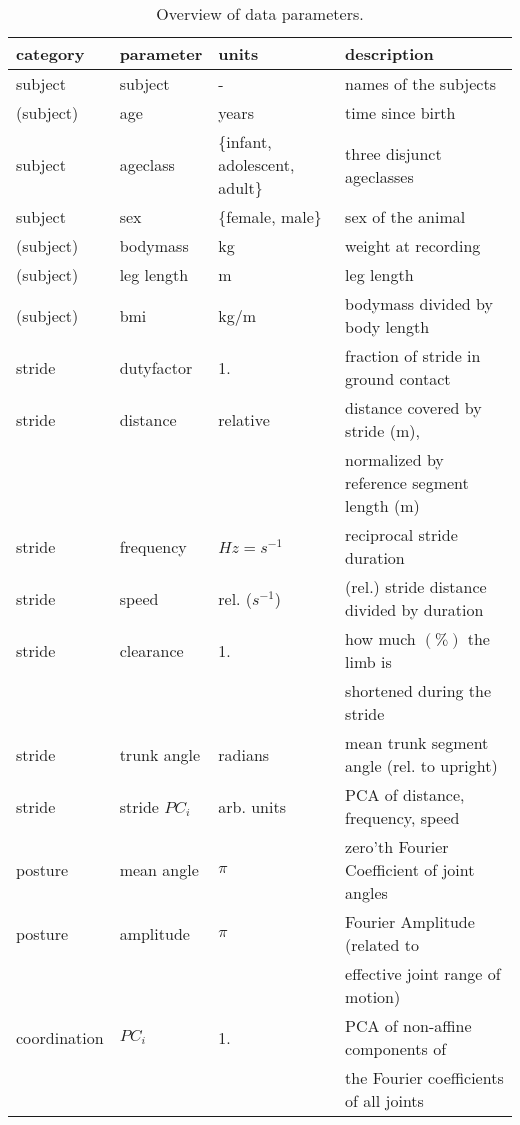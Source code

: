 \begin{table}[p]
\caption{\label{tab:parameters}Overview of data parameters.}
\centering
\begin{footnotesize}
\begin{tabular}{llll}
\hline
\textbf{category} & \textbf{parameter} & \textbf{units} & \textbf{description}\\[0pt]
\hline
\hline
subject & subject & - & names of the subjects\\[0pt]
(subject) & age & years & time since birth\\[0pt]
subject & ageclass & \{infant, adolescent, adult\} & three disjunct ageclasses\\[0pt]
subject & sex & \{female, male\} & sex of the animal\\[0pt]
(subject) & bodymass & kg & weight at recording\\[0pt]
(subject) & leg length & m & leg length\\[0pt]
(subject) & bmi & kg/m & bodymass divided by body length\\[0pt]
\hline
stride & dutyfactor & 1. & fraction of stride in ground contact\\[0pt]
stride & distance & relative & distance covered by stride (m),\\[0pt]
 &  &  & normalized by reference segment length (m)\\[0pt]
stride & frequency & \(Hz = s^{-1}\) & reciprocal stride duration\\[0pt]
stride & speed & rel. (\(s^{-1}\)) & (rel.) stride distance divided by duration\\[0pt]
stride & clearance & 1. & how much \((\%)\) the limb is\\[0pt]
 &  &  & shortened during the stride\\[0pt]
stride & trunk angle & radians & mean trunk segment angle (rel. to upright)\\[0pt]
stride & stride \(PC_{i}\) & arb. units & PCA of distance, frequency, speed\\[0pt]
\hline
posture & mean angle & \(\pi\) & zero'th Fourier Coefficient of joint angles\\[0pt]
posture & amplitude & \(\pi\) & Fourier Amplitude (related to\\[0pt]
 &  &  & effective joint range of motion)\\[0pt]
\hline
coordination & \(PC_{i}\) & 1. & PCA of non-affine components of\\[0pt]
 &  &  & the Fourier coefficients of all joints\\[0pt]
\hline
\end{tabular}
\end{footnotesize}
\end{table}


